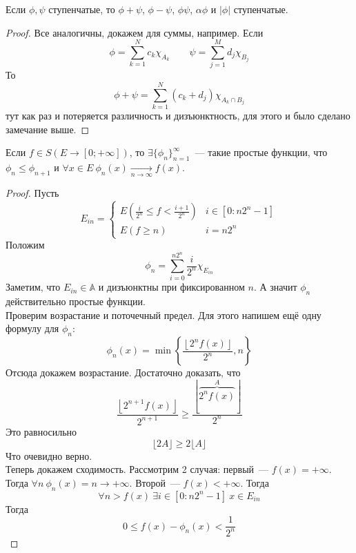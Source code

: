 \documentclass{article}
\begin{document}
    \begin{property}
        Если $\phi,\psi$ ступенчатые, то $\phi+\psi$, $\phi-\psi$, $\phi\psi$, $\alpha\phi$ и $|\phi|$ ступенчатые.
    \end{property}
    \begin{proof}
        Все аналогичны, докажем для суммы, например. Если
        $$
        \phi=\sum\limits_{k=1}^Nc_k\chi_{A_k}\qquad \psi=\sum\limits_{j=1}^Md_j\chi_{B_j}
        $$
        То
        $$
        \phi+\psi=\sum\limits_{k=1}^N(c_k+d_j)\chi_{A_k\cap B_j}
        $$
        тут как раз и потеряется различность и дизъюнктность, для этого и было сделано замечание выше.
    \end{proof}
    \begin{theorem}
        \label{Приближение измеримой функции простыми}
        Если $f\in S(E\to[0;+\infty])$, то $\exists\{\phi_n\}_{n=1}^\infty$~--- такие простые функции, что $\phi_n\leqslant\phi_{n+1}$ и $\forall x\in E~\phi_n(x)\underset{n\to\infty}\longrightarrow f(x)$.
    \end{theorem}
    \begin{proof}
        Пусть
        $$
        E_{in}=\begin{cases}
            E\left(\frac i{2^n}\leqslant f<\frac{i+1}{2^n}\right) & i\in[0:n2^n-1]\\
            E(f\geqslant n) & i=n2^n
        \end{cases}
        $$
        Положим
        $$\phi_n=\sum\limits_{i=0}^{n2^n}\frac i{2^n}\chi_{E_{in}}$$
        Заметим, что $E_{in}\in\mathbb A$ и дизъюнктны при фиксированном $n$. А значит $\phi_n$ действительно простые функции.\\
        Проверим возрастание и поточечный предел. Для этого напишем ещё одну формулу для $\phi_n$:
        $$
        \phi_n(x)=\min\left\{\frac{\left\lfloor2^nf(x)\right\rfloor}{2^n},n\right\}
        $$
        Отсюда докажем возрастание. Достаточно доказать, что
        $$
        \frac{\left\lfloor2^{n+1}f(x)\right\rfloor}{2^{n+1}}\geqslant\frac{\left\lfloor\overbrace{2^nf(x)}^A\right\rfloor}{2^n}
        $$
        Это равносильно
        $$
        \lfloor 2A\rfloor\geqslant2\lfloor A\rfloor
        $$
        Что очевидно верно.\\
        Теперь докажем сходимость. Рассмотрим 2 случая: первый~--- $f(x)=+\infty$. Тогда $\forall n~\phi_n(x)=n\rightarrow+\infty$. Второй~--- $f(x)<+\infty$. Тогда
        $$\forall n>f(x)~\exists i\in[0:n2^n-1]~x\in E_{in}$$
        Тогда
        $$0\leqslant f(x)-\phi_n(x)<\frac1{2^n}$$
    \end{proof}
\end{document}
